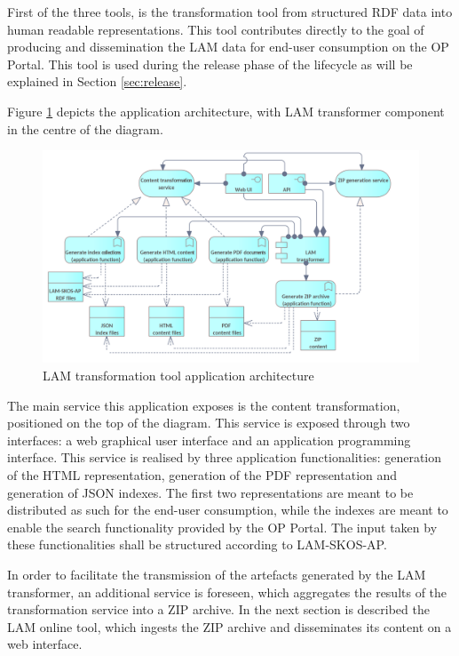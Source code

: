 	First of the three tools, is the transformation tool from structured RDF data into human readable representations. This tool contributes directly to the goal of producing and dissemination the LAM data for end-user consumption on the OP Portal. This tool is used during the release phase of the lifecycle as will be explained in Section \ref{sec:release}.	
	
	Figure \ref{fig:app-transformation-tool} depicts the application architecture, with LAM transformer component in the centre of the diagram.
	
	
    \begin{figure}[!h]
		\centering
		\includegraphics[width=.98\textwidth]{images/application/Content transformer.png}
		\caption{LAM transformation tool application architecture}
		\label{fig:app-transformation-tool}
	\end{figure}



	The main service this application exposes is the content transformation, positioned on the top of the diagram. This service is exposed through two interfaces: a web graphical user interface and an application programming interface. This service is realised by three application functionalities: generation of the HTML representation, generation of the PDF representation and generation of JSON indexes. The first two representations are meant to be distributed as such for the end-user consumption, while the indexes are meant to enable the search functionality provided by the OP Portal. The input taken by these functionalities shall be structured according to LAM-SKOS-AP\cite{lam-skos-ap-2019}.
	
	In order to facilitate the transmission of the artefacts generated by the LAM transformer, an additional service is foreseen, which aggregates the results of the transformation service into a ZIP archive. In the next section is described the LAM online tool, which ingests the ZIP archive and disseminates its content on a web interface. 
	
